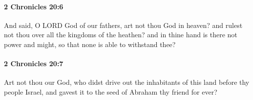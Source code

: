 		\paragraph{2 Chronicles 20:6} %
			\label{2CHRONICLES-20-6}

			And said, O LORD God of our fathers, art not thou God in heaven? and rulest not thou over all the kingdoms of the heathen? and in thine hand is there not power and might, so that none is able to withstand thee?


		\paragraph{2 Chronicles 20:7} %
			\label{2CHRONICLES-20-7}

			Art not thou our God, who didst drive out the inhabitants of this land before thy people Israel, and gavest it to the seed of Abraham thy friend for ever?

